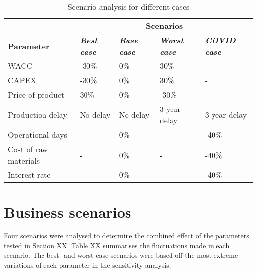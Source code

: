 
\begin{wraptable}{r}{18cm}
\centering
\caption{Scenario analysis for different cases}
\label{scenario_analysis}
\begin{tabular}{lllll}
\rowcolor[HTML]{D2F3FA} 
                      & \multicolumn{4}{c}{\cellcolor[HTML]{D2F3FA}\textbf{Scenarios}}                                                          \\
\rowcolor[HTML]{D2F3FA} 
\textbf{Parameter}    & \textit{\textbf{Best case}} & \textit{\textbf{Base case}} & \textit{\textbf{Worst case}} & \textit{\textbf{COVID case}} \\
WACC                  & -30\%                       & 0\%                         & 30\%                         & -                            \\
CAPEX                 & -30\%                       & 0\%                         & 30\%                         & -                            \\
Price of product      & 30\%                        & 0\%                         & -30\%                        & -                            \\
Production delay      & No delay                    & No delay                    & 3 year delay                 & 3 year delay                 \\
Operational days      & -                           & 0\%                         & -                            & -40\%                        \\
Cost of raw materials & -                           & 0\%                         & -                            & -40\%                        \\
Interest rate         & -                           & 0\%                         & -                            & -40\%                       
\end{tabular}
\end{wraptable}

\section{Business scenarios}
Four scenarios were analysed to determine the combined effect of the parameters tested in Section XX. Table XX summarises the fluctuations made in each scenario. The best- and worst-case scenarios were based off the most extreme variations of each parameter in the sensitivity analysis. 

